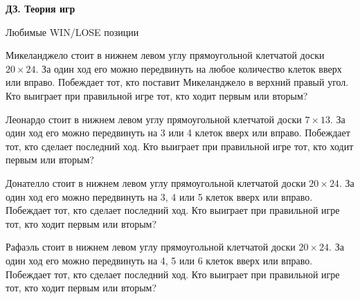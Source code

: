 \centerline{\bf \Huge ДЗ. Теория игр}
\centerline{\bf \Huge }


\begin{flushright}
        \scriptsize{Любимые WIN/LOSE позиции}
\end{flushright}

 Микеланджело стоит в нижнем левом углу прямоугольной клетчатой доски $20 \times 24$. За один ход его можно передвинуть на любое количество клеток вверх или вправо. Побеждает тот, кто поставит Микеланджело в верхний правый угол. Кто выиграет при правильной игре тот, кто ходит первым или вторым? 

 Леонардо стоит в нижнем левом углу прямоугольной клетчатой доски $7 \times 13$. За один ход его можно передвинуть на 3 или 4 клеток вверх или вправо. Побеждает тот, кто сделает последний ход. Кто выиграет при правильной игре тот, кто ходит первым или вторым? 

 Донателло стоит в нижнем левом углу прямоугольной клетчатой доски $20 \times 24$. За один ход его можно передвинуть на 3, 4 или 5 клеток вверх или вправо. Побеждает тот, кто сделает последний ход. Кто выиграет при правильной игре тот, кто ходит первым или вторым? 

 Рафаэль стоит в нижнем левом углу прямоугольной клетчатой доски $20 \times 24$. За один ход его можно передвинуть на 4, 5 или 6 клеток вверх или вправо. Побеждает тот, кто сделает последний ход. Кто выиграет при правильной игре тот, кто ходит первым или вторым? 